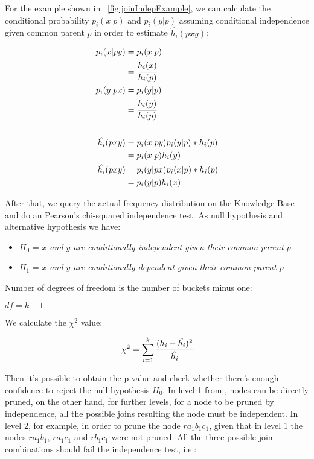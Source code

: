 For the example shown in ~\ref{fig:joinIndepExample}, we can calculate the conditional probability $p_i(x|p)$ and $p_i(y|p)$ assuming conditional independence given common parent $p$ in order to estimate $\hat{h_i}(p x y)$:

\begin{equation}
\begin{split}
 p_i(x|py) &= p_i(x|p) \\ 
 &= \cfrac{h_i(x)}{h_i(p)} \\ 
 p_i(y|px) &= p_i(y|p) \\ 
 &= \cfrac{h_i(y)}{h_i(p)} \\ \\ 
 \hat{h_i}(pxy) &= p_i(x|py)p_i(y|p)*h_i(p) \\ 
 &= p_i(x|p)h_i(y) \\ 
 \hat{h_i}(pxy) &= p_i(y|px)p_i(x|p)*h_i(p) \\ 
 &= p_i(y|p)h_i(x) 
\end{split}
\end{equation}

After that, we query the actual frequency distribution on the Knowledge Base and do an Pearson's chi-squared independence test. As null hypothesis and alternative hypothesis we have:

\begin{itemize}
 \item $H_0$ = \emph{$x$ and $y$ are conditionally independent given their common parent $p$}
 \item $H_1$ = \emph{$x$ and $y$ are conditionally dependent given their common parent $p$} 
\end{itemize}

  

Number of degrees of freedom is the number of buckets minus one:

\begin{center}
 $df=k-1$
\end{center}

We calculate the $\chi^2$ value:

\begin{equation}
 \chi^2=\sum_{i=1}^{k} \cfrac{(h_i - \hat{h_i})^2}{\hat{h_i}}
\end{equation}

\cite{Jaroszewicz02pruningredundant}

Then it's possible to obtain the p-value and check whether there's enough confidence to reject the null hypothesis $H_0$. In level 1 from \graphname, nodes can be directly pruned, on the other hand, for further levels, for a node to be pruned by independence, all the possible joins resulting the node must be independent. In level 2, for example, in order to prune the node $r a_1 b_1 c_1$, given that in level 1 the nodes $r a_1 b_1$, $r a_1 c_1$ and $r b_1 c_1$ were not pruned. All the three possible join combinations should fail the independence test, i.e.:

